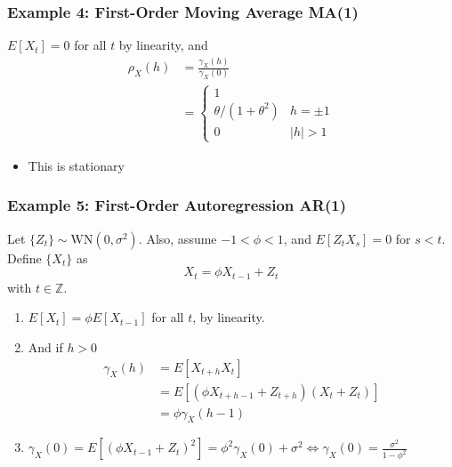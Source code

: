 \documentclass{beamer}
\begin{document}

\begin{frame}
\frametitle{Example 4: First-Order Moving Average MA(1) }

$E[X_t] = 0$ for all $t$ by linearity, and 
\begin{align*}
\rho_X(h) &= \frac{\gamma_X(h)}{\gamma_X(0)} \\
&= \begin{cases} 
      1 \\
      \theta/(1+\theta^2) & h = \pm 1 \\
      0 & |h| > 1
   \end{cases}
\end{align*}

\begin{itemize}
\item This is stationary
\end{itemize}

\end{frame}



\begin{frame}
\frametitle{Example 5: First-Order Autoregression AR(1) }

Let $\{Z_t\} \sim \text{WN}(0, \sigma^2)$. Also, assume $-1 < \phi < 1$, and $E[Z_tX_s] = 0$ for $s < t$. Define $\{X_t\}$ as
\[
X_t = \phi X_{t-1} + Z_t \tag{*}
\]
with $t \in \mathbb{Z}$. 
\newline

\begin{enumerate}
\item $E[X_t] = \phi E[X_{t-1}]$ for all $t$, by linearity. 
\item And if $h > 0$
  \begin{align*}
    \gamma_X(h) &= E[X_{t+h}X_t] \\
    &= E[(\phi X_{t+h-1} + Z_{t+h})(X_t + Z_t)] \\
    &= \phi \gamma_X(h-1) 
  \end{align*}
\item $\gamma_X(0) = E[(\phi X_{t-1} + Z_t)^2] = \phi^2\gamma_X(0) + \sigma^2 \iff \gamma_X(0) = \frac{\sigma^2}{1-\phi^2 }$
\end{enumerate}



\end{frame}
\end{document}
